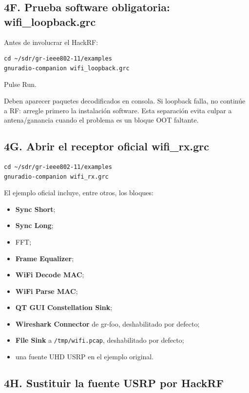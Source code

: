 \subsection{4F. Prueba software obligatoria: wifi\_loopback.grc}

Antes de involucrar el HackRF:

\begin{lstlisting}
cd ~/sdr/gr-ieee802-11/examples
gnuradio-companion wifi_loopback.grc
\end{lstlisting}

Pulse Run.

\begin{esperado}
Deben aparecer paquetes decodificados en consola. Si loopback falla, no continúe a RF: arregle primero la instalación software. Esta separación evita culpar a antena/ganancia cuando el problema es un bloque OOT faltante.
\end{esperado}

\subsection{4G. Abrir el receptor oficial wifi\_rx.grc}

\begin{lstlisting}
cd ~/sdr/gr-ieee802-11/examples
gnuradio-companion wifi_rx.grc
\end{lstlisting}

El ejemplo oficial incluye, entre otros, los bloques:

\begin{itemize}
    \item \textbf{Sync Short};
    \item \textbf{Sync Long};
    \item FFT;
    \item \textbf{Frame Equalizer};
    \item \textbf{WiFi Decode MAC};
    \item \textbf{WiFi Parse MAC};
    \item \textbf{QT GUI Constellation Sink};
    \item \textbf{Wireshark Connector} de gr-foo, deshabilitado por defecto;
    \item \textbf{File Sink} a \texttt{/tmp/wifi.pcap}, deshabilitado por defecto;
    \item una fuente UHD USRP en el ejemplo original.
\end{itemize}

\subsection{4H. Sustituir la fuente USRP por HackRF}

